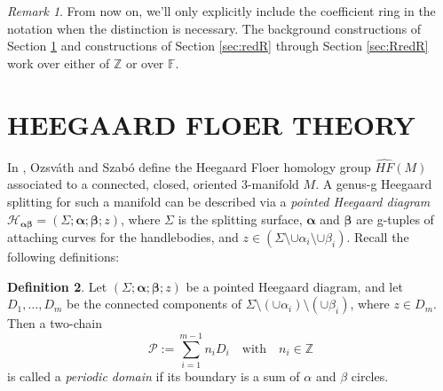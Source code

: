 \documentclass[11pt]{article}
\theoremstyle{plain} \newtheorem{thm}{Theorem}[subsection]
\theoremstyle{plain} \newtheorem{cor}[thm]{Corollary}
\theoremstyle{plain} \newtheorem{prop}[thm]{Proposition}
\theoremstyle{plain} \newtheorem{conj}[thm]{Conjecture}
\theoremstyle{plain} \newtheorem{lem}[thm]{Lemma}
\theoremstyle{definition} \newtheorem{df}[thm]{Definition}
\theoremstyle{remark} \newtheorem{rmk}[thm]{Remark}
\theoremstyle{remark} \newtheorem{obs}[thm]{Observation}
\newcommand{\h}{\mathcal{H}}
\newcommand{\OS}{Ozsv\'ath and Szab\'o }
\newcommand{\ba}{\boldsymbol{\alpha}}
\newcommand{\bb}{\boldsymbol{\beta}}
\numberwithin{equation}{section}
\begin{document}
\begin{rmk}
From now on, we'll only explicitly include the coefficient ring in the notation when the distinction is necessary.  The background constructions of Section \ref{sec:HF} and constructions of Section \ref{sec:redR} through Section \ref{sec:RredR}  work over either of $\mathbb{Z}$ or over $\mathbb{F}$.
\end{rmk}




\section{HEEGAARD FLOER THEORY}\label{sec:HF}

In \cite{os:disk}, \OS define the Heegaard Floer homology group $\widehat{HF}(M)$ associated to a connected, closed, oriented 3-manifold $M$.  A genus-g Heegaard splitting for such a manifold can be described via a \textit{pointed Heegaard diagram} $\h_{\ba\bb} = \left(\Sigma; \ba; \bb; z\right)$, where $\Sigma$ is the splitting surface, $\ba$ and $\bb$ are g-tuples of attaching curves for the handlebodies, and $z \in (\Sigma \setminus \cup \alpha_{i} \setminus \cup \beta_{i})$.  Recall the following definitions:

\begin{df}\label{df:pd}
Let $\left(\Sigma; \ba; \bb; z\right)$ be a pointed Heegaard diagram, and let $D_1, \ldots, D_m$ be the connected components of $\Sigma \setminus \left( \cup \alpha_i \right) \setminus \left( \cup \beta_i \right)$, where $z \in D_m$.  Then a two-chain
$$ \mathcal{P}:= \sum_{i =1}^{m-1}n_{i} D_i \quad \text{with} \quad n_i \in \mathbb{Z}$$
is called a \textit{periodic domain} if its boundary is a sum of $\alpha$ and $\beta$ circles.
\end{df}
\end{document}
